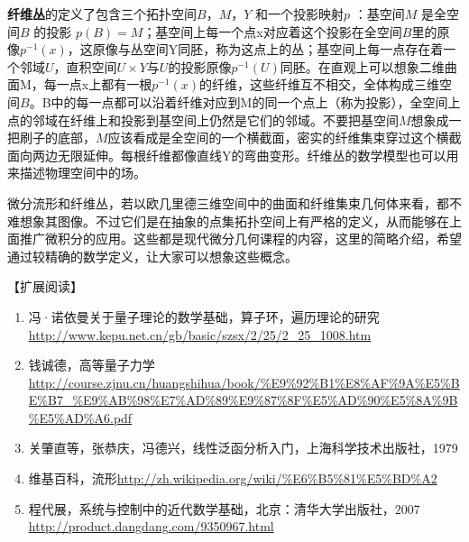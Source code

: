\textbf{纤维丛}的定义了包含三个拓扑空间$ B，M，Y $ 和一个投影映射$ p $ ：基空间$ M $ 是全空间$ B $ 的投影 $ p(B)=M $；基空间上每一个点x对应着这个投影在全空间$ B $里的原像$ p^{-1}(x) $，这原像与丛空间Y同胚，称为这点上的丛；基空间上每一点存在着一个邻域$ U $，直积空间$ U\times Y $与$ U $的投影原像$ p^{-1}(U) $同胚。在直观上可以想象二维曲面M，每一点x上都有一根$ p^{-1}(x) $的纤维，这些纤维互不相交，全体构成三维空间$ B $。B中的每一点都可以沿着纤维对应到M的同一个点上（称为投影），全空间上点的邻域在纤维上和投影到基空间上仍然是它们的邻域。不要把基空间$ M $想象成一把刷子的底部，$ M $应该看成是全空间的一个横截面，密实的纤维集束穿过这个横截面向两边无限延伸。每根纤维都像直线Y的弯曲变形。纤维丛的数学模型也可以用来描述物理空间中的场。

微分流形和纤维丛，若以欧几里德三维空间中的曲面和纤维集束几何体来看，都不难想象其图像。不过它们是在抽象的点集拓扑空间上有严格的定义，从而能够在上面推广微积分的应用。这些都是现代微分几何课程的内容，这里的简略介绍，希望通过较精确的数学定义，让大家可以想象这些概念。

【扩展阅读】

\begin{enumerate}
	\item 冯·诺依曼关于量子理论的数学基础，算子环，遍历理论的研究 \url{http://www.kepu.net.cn/gb/basic/szsx/2/25/2_25_1008.htm} 
	
	\item 钱诚德，高等量子力学	\url{http://course.zjnu.cn/huangshihua/book/\%E9\%92\%B1\%E8\%AF\%9A\%E5\%BE\%B7_\%E9\%AB\%98\%E7\%AD\%89\%E9\%87\%8F\%E5\%AD\%90\%E5\%8A\%9B\%E5\%AD\%A6.pdf}
	
	\item 关肇直等，张恭庆，冯德兴，线性泛函分析入门，上海科学技术出版社，1979
	
	\item 维基百科，流形\url{http://zh.wikipedia.org/wiki/\%E6\%B5\%81\%E5\%BD\%A2}
	
	\item 程代展，系统与控制中的近代数学基础，北京：清华大学出版社，2007 \url{http://product.dangdang.com/9350967.html}

\end{enumerate}